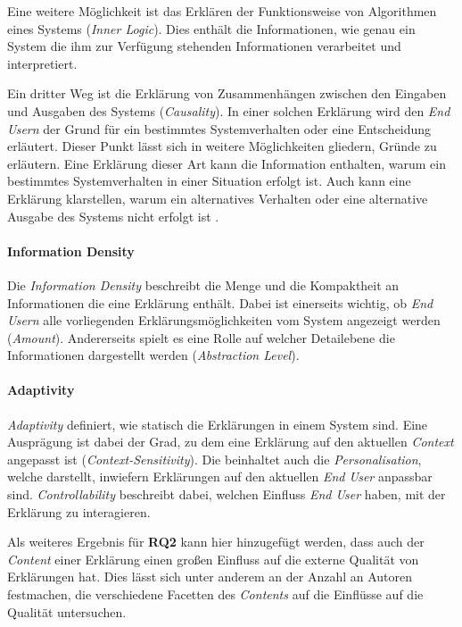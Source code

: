 Eine weitere Möglichkeit ist das Erklären der Funktionsweise von Algorithmen eines Systems (\textit{Inner Logic}). Dies enthält die Informationen, wie genau ein System die ihm zur Verfügung stehenden Informationen verarbeitet und interpretiert.

Ein dritter Weg ist die Erklärung von Zusammenhängen zwischen den Eingaben und Ausgaben des Systems (\textit{Causality}). In einer solchen Erklärung wird den \textit{End Usern} der Grund für ein bestimmtes Systemverhalten oder eine Entscheidung erläutert. Dieser Punkt lässt sich in weitere Möglichkeiten gliedern, Gründe zu erläutern. Eine Erklärung dieser Art kann die Information enthalten, warum ein bestimmtes Systemverhalten in einer Situation erfolgt ist. Auch kann eine Erklärung klarstellen, warum ein alternatives Verhalten oder eine alternative Ausgabe des Systems nicht erfolgt ist \cite{martin_evaluating_2021}. %


\paragraph{Information Density} Die \textit{Information Density} beschreibt die Menge und die Kompaktheit an Informationen die eine Erklärung enthält. Dabei ist einerseits wichtig, ob \textit{End Usern} alle vorliegenden Erklärungsmöglichkeiten vom System angezeigt werden (\textit{Amount}). Andererseits spielt es eine Rolle auf welcher Detailebene die Informationen dargestellt werden (\textit{Abstraction Level}).

\paragraph{Adaptivity} \textit{Adaptivity} definiert, wie statisch die Erklärungen in einem System sind. Eine Ausprägung ist dabei der Grad, zu dem eine Erklärung auf den aktuellen \textit{Context} angepasst ist (\textit{Context-Sensitivity}). Die beinhaltet auch die \textit{Personalisation}, welche darstellt, inwiefern Erklärungen auf den aktuellen \textit{End User} anpassbar sind. \textit{Controllability} beschreibt dabei, welchen Einfluss \textit{End User} haben, mit der Erklärung zu interagieren.

\bigskip

Als weiteres Ergebnis für \textbf{RQ2} kann hier hinzugefügt werden, dass auch der \textit{Content} einer Erklärung einen großen Einfluss auf die externe Qualität von Erklärungen hat. Dies lässt sich unter anderem an der Anzahl an Autoren festmachen, die verschiedene Facetten des \textit{Contents} auf die Einflüsse auf die Qualität untersuchen.

